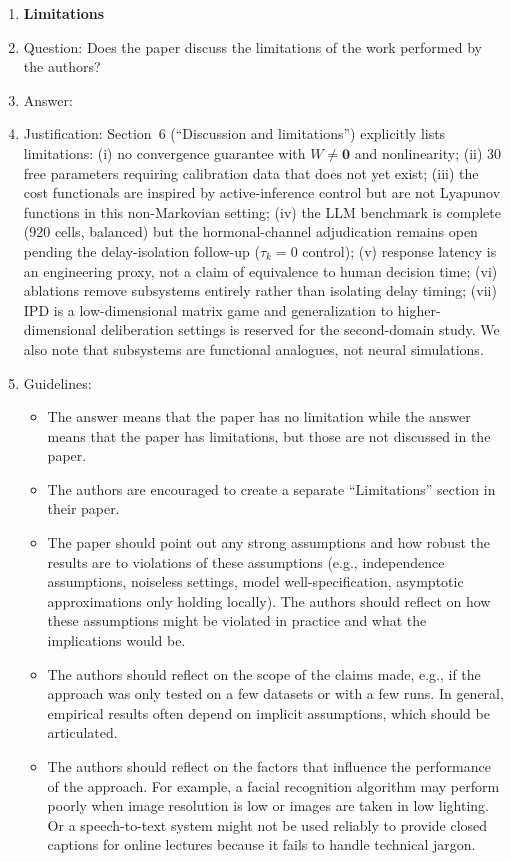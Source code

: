 \begin{enumerate}
\item {\bf Limitations}
    \item[] Question: Does the paper discuss the limitations of the work performed by the authors?
    \item[] Answer: \answerYes{}
    \item[] Justification: Section~6 (``Discussion and limitations'') explicitly lists limitations: (i) no convergence guarantee with $W \neq \mathbf{0}$ and nonlinearity; (ii) 30 free parameters requiring calibration data that does not yet exist; (iii) the cost functionals are inspired by active-inference control but are not Lyapunov functions in this non-Markovian setting; (iv) the LLM benchmark is complete (920 cells, balanced) but the hormonal-channel adjudication remains open pending the delay-isolation follow-up ($\tau_k=0$ control); (v) response latency is an engineering proxy, not a claim of equivalence to human decision time; (vi) ablations remove subsystems entirely rather than isolating delay timing; (vii) IPD is a low-dimensional matrix game and generalization to higher-dimensional deliberation settings is reserved for the second-domain study. We also note that subsystems are functional analogues, not neural simulations.
    \item[] Guidelines:
    \begin{itemize}
        \item The answer \answerNA{} means that the paper has no limitation while the answer \answerNo{} means that the paper has limitations, but those are not discussed in the paper. 
        \item The authors are encouraged to create a separate ``Limitations'' section in their paper.
        \item The paper should point out any strong assumptions and how robust the results are to violations of these assumptions (e.g., independence assumptions, noiseless settings, model well-specification, asymptotic approximations only holding locally). The authors should reflect on how these assumptions might be violated in practice and what the implications would be.
        \item The authors should reflect on the scope of the claims made, e.g., if the approach was only tested on a few datasets or with a few runs. In general, empirical results often depend on implicit assumptions, which should be articulated.
        \item The authors should reflect on the factors that influence the performance of the approach. For example, a facial recognition algorithm may perform poorly when image resolution is low or images are taken in low lighting. Or a speech-to-text system might not be used reliably to provide closed captions for online lectures because it fails to handle technical jargon.

\end{itemize}
\end{enumerate}
